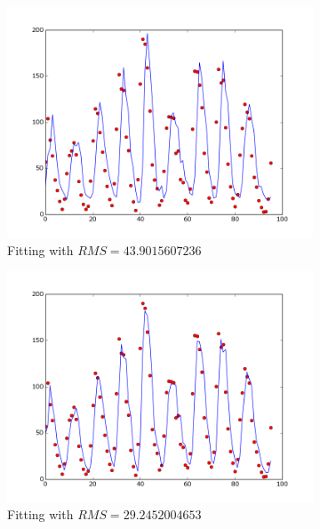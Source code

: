 \documentclass{article}
\begin{document}
\begin{figure}[!ht]
    \centering
    \begin{subfigure}[b]{0.47\textwidth}
        \includegraphics[width=\textwidth]{Part2/II211.png}
        \caption{Fitting with $RMS = 43.9015607236$}
    \end{subfigure}
    \begin{subfigure}[b]{0.47\textwidth}
        \includegraphics[width=\textwidth]{Part2/II212.png}
        \caption{Fitting with $RMS = 29.2452004653$}
    \end{subfigure}
    \begin{subfigure}[b]{0.47\textwidth}

\end{subfigure}
\end{figure}
\end{document}

